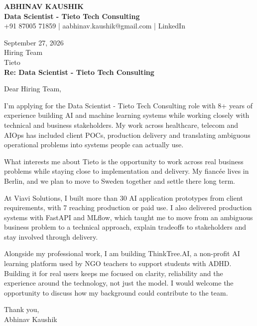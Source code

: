 \documentclass[10pt,a4paper]{article}
\begin{document}
\begin{center}
{\Large\bfseries ABHINAV KAUSHIK}\\[2pt]
{\bfseries Data Scientist - Tieto Tech Consulting}\\[2pt]
+91 87005 71859 \quad | \quad aabhinav.kaushik@gmail.com \quad | \quad LinkedIn
\end{center}
\vspace{8pt}
September 27, 2026\\[6pt]
Hiring Team\\
Tieto\\[4pt]
\textbf{Re: Data Scientist - Tieto Tech Consulting}

Dear Hiring Team,

I’m applying for the Data Scientist - Tieto Tech Consulting role with 8+ years of experience building AI and machine learning systems while working closely with technical and business stakeholders. My work across healthcare, telecom and AIOps has included client POCs, production delivery and translating ambiguous operational problems into systems people can actually use.

What interests me about Tieto is the opportunity to work across real business problems while staying close to implementation and delivery. My fiancée lives in Berlin, and we plan to move to Sweden together and settle there long term.

At Viavi Solutions, I built more than 30 AI application prototypes from client requirements, with 7 reaching production or paid use. I also delivered production systems with FastAPI and MLflow, which taught me to move from an ambiguous business problem to a technical approach, explain tradeoffs to stakeholders and stay involved through delivery.

Alongside my professional work, I am building ThinkTree.AI, a non-profit AI learning platform used by NGO teachers to support students with ADHD. Building it for real users keeps me focused on clarity, reliability and the experience around the technology, not just the model. I would welcome the opportunity to discuss how my background could contribute to the team.

Thank you,\\
Abhinav Kaushik
\end{document}

